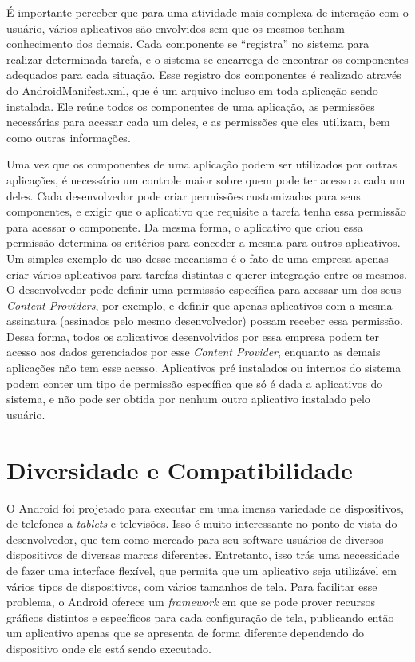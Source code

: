 É importante perceber que para uma atividade mais complexa de interação com o usuário, vários aplicativos são envolvidos sem que os mesmos tenham conhecimento dos demais. Cada componente se ``registra'' no sistema para realizar determinada tarefa, e o sistema se encarrega de encontrar os componentes adequados para cada situação. Esse registro dos componentes é realizado através do AndroidManifest.xml, que é um arquivo incluso em toda aplicação sendo instalada. Ele reúne todos os componentes de uma aplicação, as permissões necessárias para acessar cada um deles, e as permissões que eles utilizam, bem como outras informações. 

Uma vez que os componentes de uma aplicação podem ser utilizados por outras aplicações, é necessário um controle maior sobre quem pode ter acesso a cada um deles. Cada desenvolvedor pode criar permissões customizadas para seus componentes, e exigir que o aplicativo que requisite a tarefa tenha essa permissão para acessar o componente. Da mesma forma, o aplicativo que criou essa permissão determina os critérios para conceder a mesma para outros aplicativos. Um simples exemplo de uso desse mecanismo é o fato de uma empresa apenas criar vários aplicativos para tarefas distintas e querer integração entre os mesmos. O desenvolvedor pode definir uma permissão específica para acessar um dos seus \textit{Content Providers}, por exemplo, e definir que apenas aplicativos com a mesma assinatura (assinados pelo mesmo desenvolvedor) possam receber essa permissão. Dessa forma, todos os aplicativos desenvolvidos por essa empresa podem ter acesso aos dados gerenciados por esse \textit{Content Provider}, enquanto as demais aplicações não tem esse acesso. Aplicativos pré instalados ou internos do sistema podem conter um tipo de permissão específica que só é dada a aplicativos do sistema, e não pode ser obtida por nenhum outro aplicativo instalado pelo usuário.

\section{Diversidade e Compatibilidade}

O Android foi projetado para executar em uma imensa variedade de dispositivos, de telefones a \textit{tablets} e televisões. Isso é muito interessante no ponto de vista do desenvolvedor, que tem como mercado para seu software usuários de diversos dispositivos de diversas marcas diferentes. Entretanto, isso trás uma necessidade de fazer uma interface flexível, que permita que um aplicativo seja utilizável em vários tipos de dispositivos, com vários tamanhos de tela. Para facilitar esse problema, o Android oferece um \textit{framework} em que se pode prover recursos gráficos distintos e específicos para cada configuração de tela, publicando então um aplicativo apenas que se apresenta de forma diferente dependendo do dispositivo onde ele está sendo executado.  

